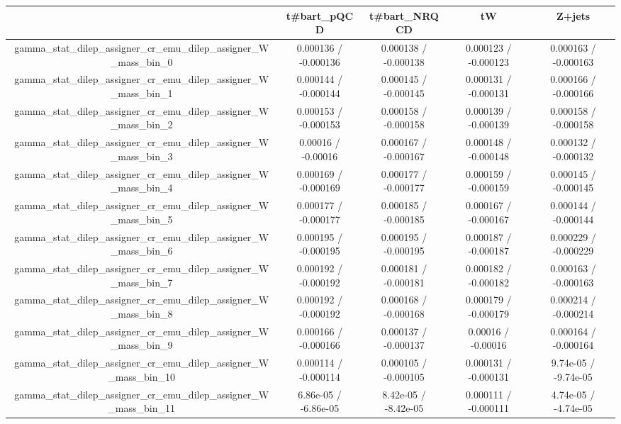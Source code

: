 \documentclass[10pt]{article}
\begin{document}
\begin{table}[htbp]
\begin{center}
\begin{tabular}{|c|c|c|c|c|}
\hline 
      & t#bar{t}_{pQCD}      & t#bar{t}_{NRQCD}      & tW      & Z+jets \\ 
\hline 
  gamma_stat_dilep_assigner_cr_emu_dilep_assigner_W_mass_bin_0 & 0.000136 / -0.000136 & 0.000138 / -0.000138 & 0.000123 / -0.000123 & 0.000163 / -0.000163 \\ 
  gamma_stat_dilep_assigner_cr_emu_dilep_assigner_W_mass_bin_1 & 0.000144 / -0.000144 & 0.000145 / -0.000145 & 0.000131 / -0.000131 & 0.000166 / -0.000166 \\ 
  gamma_stat_dilep_assigner_cr_emu_dilep_assigner_W_mass_bin_2 & 0.000153 / -0.000153 & 0.000158 / -0.000158 & 0.000139 / -0.000139 & 0.000158 / -0.000158 \\ 
  gamma_stat_dilep_assigner_cr_emu_dilep_assigner_W_mass_bin_3 & 0.00016 / -0.00016 & 0.000167 / -0.000167 & 0.000148 / -0.000148 & 0.000132 / -0.000132 \\ 
  gamma_stat_dilep_assigner_cr_emu_dilep_assigner_W_mass_bin_4 & 0.000169 / -0.000169 & 0.000177 / -0.000177 & 0.000159 / -0.000159 & 0.000145 / -0.000145 \\ 
  gamma_stat_dilep_assigner_cr_emu_dilep_assigner_W_mass_bin_5 & 0.000177 / -0.000177 & 0.000185 / -0.000185 & 0.000167 / -0.000167 & 0.000144 / -0.000144 \\ 
  gamma_stat_dilep_assigner_cr_emu_dilep_assigner_W_mass_bin_6 & 0.000195 / -0.000195 & 0.000195 / -0.000195 & 0.000187 / -0.000187 & 0.000229 / -0.000229 \\ 
  gamma_stat_dilep_assigner_cr_emu_dilep_assigner_W_mass_bin_7 & 0.000192 / -0.000192 & 0.000181 / -0.000181 & 0.000182 / -0.000182 & 0.000163 / -0.000163 \\ 
  gamma_stat_dilep_assigner_cr_emu_dilep_assigner_W_mass_bin_8 & 0.000192 / -0.000192 & 0.000168 / -0.000168 & 0.000179 / -0.000179 & 0.000214 / -0.000214 \\ 
  gamma_stat_dilep_assigner_cr_emu_dilep_assigner_W_mass_bin_9 & 0.000166 / -0.000166 & 0.000137 / -0.000137 & 0.00016 / -0.00016 & 0.000164 / -0.000164 \\ 
  gamma_stat_dilep_assigner_cr_emu_dilep_assigner_W_mass_bin_10 & 0.000114 / -0.000114 & 0.000105 / -0.000105 & 0.000131 / -0.000131 & 9.74e-05 / -9.74e-05 \\ 
  gamma_stat_dilep_assigner_cr_emu_dilep_assigner_W_mass_bin_11 & 6.86e-05 / -6.86e-05 & 8.42e-05 / -8.42e-05 & 0.000111 / -0.000111 & 4.74e-05 / -4.74e-05 \\ 

\end{tabular}
\end{center}
\end{table}
\end{document}
